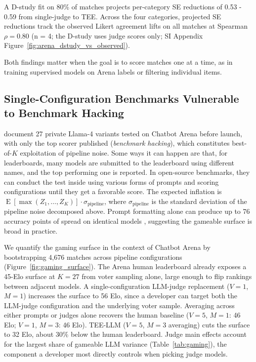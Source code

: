 \documentclass{article}
\DeclareMathOperator{\E}{E}
\begin{document}
A D-study fit on 80\% of matches projects per-category SE reductions of 0.53 - 0.59 from single-judge to TEE. Across the four categories, projected SE reductions track the observed Likert agreement lifts on all matches at Spearman $\rho = 0.80$ (n = 4; the D-study uses judge scores only; SI Appendix Figure~\ref{fig:arena_dstudy_vs_observed}).

Both findings matter when the goal is to score matches one at a time, as in training supervised models on Arena labels \citep{egami2024dsl} or filtering individual items.



\subsection{Single-Configuration Benchmarks Vulnerable to Benchmark Hacking}
\label{sec:gaming}

\citet{singh2025leaderboard} document 27 private Llama-4 variants tested on Chatbot Arena before launch, with only the top scorer published (\emph{benchmark hacking}), which constitutes best-of-$K$ exploitation of pipeline noise. Some ways it can happen are that, for leaderboards, many models are submitted to the leaderboard using different names, and the top performing one is reported. In open-source benchmarks, they can conduct the test inside using various forms of prompts and scoring configurations until they get a favorable score. The expected inflation is $\E[\max(Z_1,\ldots,Z_K)] \cdot \sigma_{\text{pipeline}}$, where $\sigma_{\text{pipeline}}$ is the standard deviation of the pipeline noise decomposed above. Prompt formatting alone can produce up to 76 accuracy points of spread on identical models \citep{sclar2024sensitivity}, suggesting the gameable surface is broad in practice.

We quantify the gaming surface in the context of Chatbot Arena by bootstrapping 4,676 matches across pipeline configurations (Figure~\ref{fig:gaming_surface}). The Arena human leaderboard already exposes a 45-Elo surface at $K{=}27$ from voter sampling alone, large enough to flip rankings between adjacent models. A single-configuration LLM-judge replacement ($V{=}1$, $M{=}1$) increases the surface to 56 Elo, since a developer can target both the LLM-judge configuration and the underlying voter sample. Averaging across either prompts or judges alone recovers the human baseline ($V{=}5$, $M{=}1$: 46 Elo; $V{=}1$, $M{=}3$: 46 Elo). TEE-LLM ($V{=}5$, $M{=}3$ averaging) cuts the surface to 32 Elo, about 30\% below the human leaderboard. Judge main effects account for the largest share of gameable LLM variance (Table~\ref{tab:gaming}), the component a developer most directly controls when picking judge models.
\end{document}
